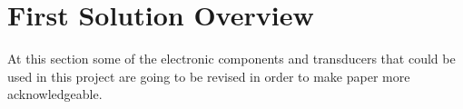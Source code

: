\section{First Solution Overview}\label{sec:electronic-background}
		At this section some of the electronic components and transducers that could be used in this project are going to be revised in order to make paper more acknowledgeable.
	
	
	
	
	
	
	
	
	
	
	